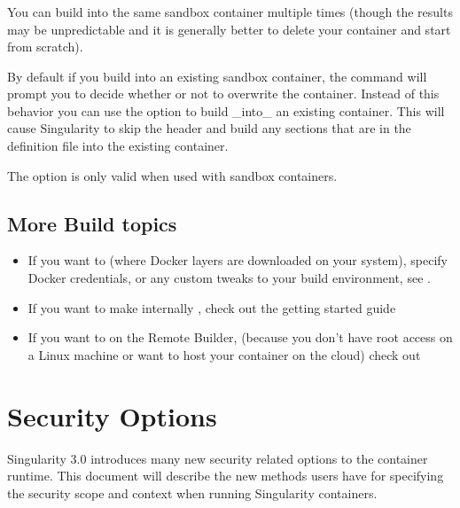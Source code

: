 \documentclass[letterpaper,10pt,english]{sphinxmanual}
\begin{document}
\subsection{}
\label{\detokenize{build_a_container:update}}
You can build into the same sandbox container multiple times (though the results
may be unpredictable and it is generally better to delete your container and
start from scratch).

By default if you build into an existing sandbox container, the  
command will prompt you to decide whether or not to overwrite the container.
Instead of this behavior you can use the  option to build \_into\_ an
existing container. This will cause Singularity to skip the header and build
any sections that are in the definition file into the existing container.

The  option is only valid when used with sandbox containers.


\section{More Build topics}
\label{\detokenize{build_a_container:more-build-topics}}\begin{itemize}
\item {} 
If you want to  (where Docker layers are
downloaded on your system), specify Docker credentials, or any custom tweaks
to your build environment, see .

\item {} 
If you want to make internally , check out the getting
started guide 

\item {} 
If you want to  on the Remote Builder, (because you
don’t have root access on a Linux machine or want to host your container on
the cloud) check out 

\end{itemize}


\chapter{Security Options}
\label{\detokenize{security_options:security-options}}\label{\detokenize{security_options:id1}}\label{\detokenize{security_options::doc}}\label{\detokenize{security_options:sec-security-options}}
Singularity 3.0 introduces many new security related options to the container
runtime.  This document will describe the new methods users have for specifying
the security scope and context when running Singularity containers.
\end{document}
